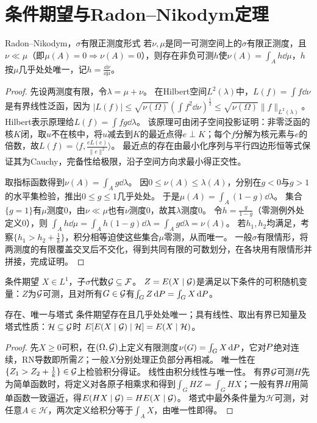 \section{条件期望与Radon--Nikodym定理}\label{sec:105}
\begin{theorem}{Radon--Nikodym，\ensuremath{\sigma}有限正测度形式}
若$\nu,\mu$是同一可测空间上的$\sigma$有限正测度，且$\nu\ll\mu$（即$\mu(A)=0\Rightarrow\nu(A)=0$），则存在非负可测$h$使$\nu(A)=\int_Ah\dd\mu$，$h$按$\mu$几乎处处唯一，记$h=\frac{\dd\nu}{\dd\mu}$。
\end{theorem}
\begin{proof}
先设两测度有限，令$\lambda=\mu+\nu$。
在Hilbert空间$L^2(\lambda)$中，$L(f)=\int f\dd\nu$是有界线性泛函，因为
$|L(f)|\le\sqrt{\nu(\Omega)}(\int f^2\dd\nu)^{\frac{1}{2}}\le\sqrt{\nu(\Omega)}\|f\|_{L^2(\lambda)}$。
Hilbert表示原理给$L(f)=\int fg\dd\lambda$。
该原理可由闭子空间投影证明：非零泛函的核$K$闭，取$u$不在核中，将$u$减去到$K$的最近点得$e\perp K$；每个$f$分解为核元素与$e$的倍数，故$L(f)=\langle f,\frac{eL(e)}{\|e\|^2}\rangle$。
最近点的存在由最小化序列与平行四边形恒等式保证其为Cauchy，完备性给极限，沿子空间方向求最小得正交性。

取指标函数得到$\nu(A)=\int_Ag\dd\lambda$。
因$0\le\nu(A)\le\lambda(A)$，分别在$g<0$与$g>1$的水平集检验，推出$0\le g\le1$几乎处处。
于是$\mu(A)=\int_A(1-g)\dd\lambda$。
集合$\{g=1\}$有$\mu$测度0，由$\nu\ll\mu$也有$\nu$测度0，故其$\lambda$测度0。
令$h=\frac{g}{1-g}$（零测例外处定义0），则
$\int_Ah\dd\mu=\int_Ah(1-g)\dd\lambda=\int_Ag\dd\lambda=\nu(A)$。
若$h_1,h_2$均满足，考察$\{h_1>h_2+\frac{1}{k}\}$，积分相等迫使这些集合$\mu$零测，从而唯一。
一般$\sigma$有限情形，将两测度的有限覆盖交叉后不交化，得到共同有限的可数划分，在各块用有限情形并拼接，完成证明。
\end{proof}
\begin{definition}{条件期望}
$X\in L^1$，子$\sigma$代数$\mathcal G\subseteq\mathcal F$。
$Z=E(X\mid\mathcal G)$是满足以下条件的可积随机变量：$Z$为$\mathcal G$可测，且对所有$G\in\mathcal G$有$\int_GZ\,\mathrm dP=\int_GX\,\mathrm dP$。
\end{definition}
\begin{theorem}{存在、唯一与塔式}
条件期望存在且几乎处处唯一；具有线性、取出有界已知量及塔式性质：$\mathcal H\subseteq\mathcal G$时
$E[E(X\mid\mathcal G)\mid\mathcal H]=E(X\mid\mathcal H)$。
\end{theorem}
\begin{proof}
先$X\ge0$可积，在$(\Omega,\mathcal G)$上定义有限测度$\nu(G)=\int_GX\,\mathrm dP$，它对$P$绝对连续，RN导数即所需$Z$；一般$X$分别处理正负部分再相减。
唯一性在$\{Z_1>Z_2+\frac{1}{k}\}\in\mathcal G$上检验积分得证。
线性由积分线性与唯一性。
有界$\mathcal G$可测$H$先为简单函数时，将定义对各原子相乘求和得到$\int_GHZ=\int_GHX$；一般有界$H$用简单函数一致逼近，得$E(HX\mid\mathcal G)=HE(X\mid\mathcal G)$。
塔式中最外条件量为$\mathcal H$可测，对任意$A\in\mathcal H$，两次定义给积分等于$\int_AX$，由唯一性即得。
\end{proof}
